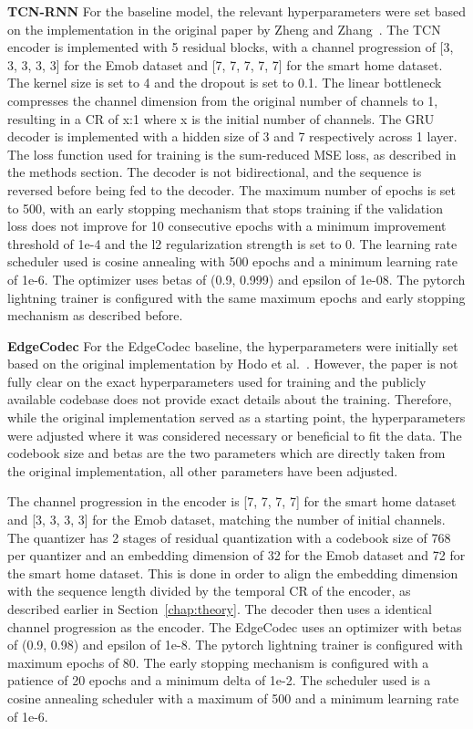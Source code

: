 \textbf{TCN-RNN} For the baseline model, the relevant hyperparameters were set based on the implementation in the original paper by Zheng and Zhang~\cite{Zheng2023}. The TCN encoder is implemented with 5 residual blocks, with a channel progression of [3, 3, 3, 3, 3] for the Emob dataset and [7, 7, 7, 7, 7] for the smart home dataset. The kernel size is set to 4 and the dropout is set to 0.1. The linear bottleneck compresses the channel dimension from the original number of channels to 1, resulting in a CR of x:1 where x is the initial number of channels. The GRU decoder is implemented with a hidden size of 3 and 7 respectively across 1 layer. The loss function used for training is the sum-reduced MSE loss, as described in the methods section. The decoder is not bidirectional, and the sequence is reversed before being fed to the decoder. The maximum number of epochs is set to 500, with an early stopping mechanism that stops training if the validation loss does not improve for 10 consecutive epochs with a minimum improvement threshold of 1e-4 and the l2 regularization strength is set to 0. The learning rate scheduler used is cosine annealing with 500 epochs and a minimum learning rate of 1e-6. The optimizer uses betas of (0.9, 0.999) and epsilon of 1e-08. The pytorch lightning trainer is configured with the same maximum epochs and early stopping mechanism as described before.

\textbf{EdgeCodec} For the EdgeCodec baseline, the hyperparameters were initially set based on the original implementation by Hodo et al.~\cite{Hodo2025}. However, the paper is not fully clear on the exact hyperparameters used for training and the publicly available codebase does not provide exact details about the training. Therefore, while the original implementation served as a starting point, the hyperparameters were adjusted where it was considered necessary or beneficial to fit the data. The codebook size and betas are the two parameters which are directly taken from the original implementation, all other parameters have been adjusted. 

The channel progression in the encoder is [7, 7, 7, 7] for the smart home dataset and [3, 3, 3, 3] for the Emob dataset, matching the number of initial channels. The quantizer has 2 stages of residual quantization with a codebook size of 768 per quantizer and an embedding dimension of 32 for the Emob dataset and 72 for the smart home dataset. This is done in order to align the embedding dimension with the sequence length divided by the temporal CR of the encoder, as described earlier in Section~\ref{chap:theory}. The decoder then uses a identical channel progression as the encoder. The EdgeCodec uses an optimizer with betas of (0.9, 0.98) and epsilon of 1e-8. The pytorch lightning trainer is configured with maximum epochs of 80. The early stopping mechanism is configured with a patience of 20 epochs and a minimum delta of 1e-2. The scheduler used is a cosine annealing scheduler with a maximum of 500 and a minimum learning rate of 1e-6.

